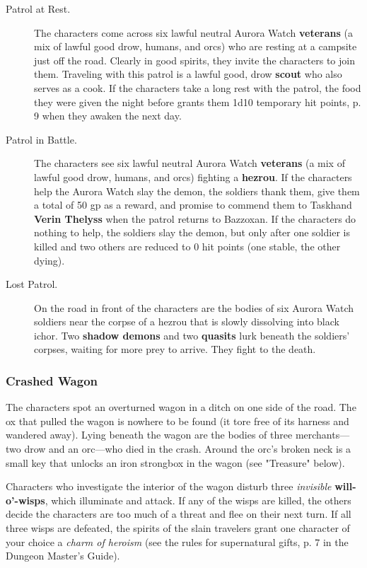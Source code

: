 \documentclass[a4paper, 11pt, bg=full, twocolumn, nooutline]{dndbook}
\begin{document}
\begin{description}
\item[Patrol at Rest.] The characters come across six lawful neutral Aurora Watch \textbf{veterans} (a mix of lawful good drow, humans, and orcs) who are resting at a campsite just off the road. Clearly in good spirits, they invite the characters to join them. Traveling with this patrol is a lawful good, drow \textbf{scout} who also serves as a cook. If the characters take a long rest with the patrol, the food they were given the night before grants them 1d10 temporary hit points, p. 9 when they awaken the next day.
\item[Patrol in Battle.] The characters see six lawful neutral Aurora Watch \textbf{veterans} (a mix of lawful good drow, humans, and orcs) fighting a \textbf{hezrou}. If the characters help the Aurora Watch slay the demon, the soldiers thank them, give them a total of 50 gp as a reward, and promise to commend them to Taskhand \textbf{Verin Thelyss} when the patrol returns to Bazzoxan. If the characters do nothing to help, the soldiers slay the demon, but only after one soldier is killed and two others are reduced to 0 hit points (one stable, the other dying).
\item[Lost Patrol.] On the road in front of the characters are the bodies of six Aurora Watch soldiers near the corpse of a hezrou that is slowly dissolving into black ichor. Two \textbf{shadow demons} and two \textbf{quasits} lurk beneath the soldiers' corpses, waiting for more prey to arrive. They fight to the death.
\end{description}

\subsubsection{Crashed Wagon}

The characters spot an overturned wagon in a ditch on one side of the road. The ox that pulled the wagon is nowhere to be found (it tore free of its harness and wandered away). Lying beneath the wagon are the bodies of three merchants---two drow and an orc---who died in the crash. Around the orc's broken neck is a small key that unlocks an iron strongbox in the wagon (see "Treasure" below).

Characters who investigate the interior of the wagon disturb three \textit{invisible} \textbf{will-o'-wisps}, which illuminate and attack. If any of the wisps are killed, the others decide the characters are too much of a threat and flee on their next turn. If all three wisps are defeated, the spirits of the slain travelers grant one character of your choice a \textit{charm of heroism} (see the rules for supernatural gifts, p. 7 in the Dungeon Master's Guide).
\end{document}
